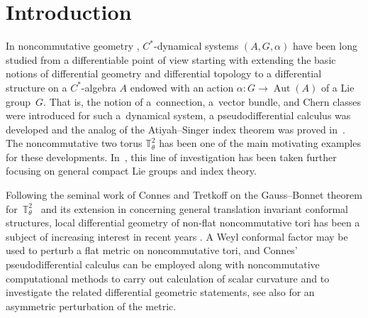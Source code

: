 \documentclass[pdftex]{sigma}
\numberwithin{equation}{section}
\begin{document}


\vspace{-2mm}

\section{Introduction}

In noncommutative geometry \cite{IHES, NCG}, $C^*$-dynamical systems
$(A, G, \alpha)$ have been long studied from a dif\/ferentiable point of
view starting with extending the basic notions of dif\/ferential
geo\-met\-ry and dif\/ferential topology to a dif\/ferential
structure on a $C^*$-algebra $A$ endowed
with an action $\alpha\colon G \to \operatorname{Aut}(A)$ of
a Lie group~$G$. That is, the notion of a~connection, a~vector bundle, and Chern classes were introduced for such a~dynamical system, a pseudodif\/ferential calculus was developed and the analog
of the Atiyah--Singer index theorem was proved in~\cite{CAlgGeoDiff}.
The noncommutative two torus $\mathbb{T}_\theta^2$ has been
one of the main motivating examples for these developments.
In~\cite{TrSpLieGpWahl}, this line of investigation has been
taken further focusing on general compact Lie groups and index theory.

Following the seminal work of Connes and Tretkof\/f on the
Gauss--Bonnet theorem for~$\mathbb{T}_\theta^2$~\cite{GaussBonnet-ConnesTretkoff} and its extension
in \cite{GaussBonnet-FK} concerning general translation invariant conformal
structures, local dif\/ferential geometry of non-f\/lat noncommutative tori
has been a subject of increasing interest
in recent years \cite{RicciBM, ModCurvCM, ScalarCurvNCtorusFK,
DixmierTraceNCtorusFK, ScalarCurv4NCTFK, MoritaLM}. A Weyl conformal factor
may be used to perturb a f\/lat metric on noncommutative tori, and Connes' pseudodif\/ferential calculus
\cite{CAlgGeoDiff} can be employed along with noncommutative computational
methods to carry out calculation of scalar curvature and to investigate
the related dif\/ferential geometric statements, see also \cite{AsymmetricDS}
for an asymmetric perturbation of the metric.
\end{document}
